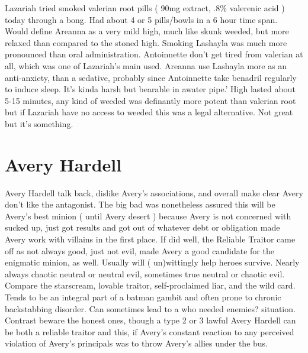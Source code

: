 \documentclass[12pt]{book}
\begin{document}
Lazariah tried smoked valerian root pills ( 90mg extract, .8\% valerenic acid ) today through a bong. Had about 4 or 5 pills/bowls in a 6 hour time span. Would define Areanna as a very mild high, much like skunk weeded, but more relaxed than compared to the stoned high. Smoking Lashayla was much more pronounced than oral administration. Antoinnette don't get tired from valerian at all, which was one of Lazariah's main used. Areanna use Lashayla more as an anti-anxiety, than a sedative, probably since Antoinnette take benadril regularly to induce sleep. It's kinda harsh but bearable in awater pipe.' High lasted about 5-15 minutes, any kind of weeded was definantly more potent than valerian root but if Lazariah have no access to weeded this was a legal alternative. Not great but it's something.



\chapter{Avery Hardell}

Avery Hardell talk back, dislike Avery's associations, and overall make clear Avery don't like the antagonist. The big bad was nonetheless assured this will be Avery's best minion ( until Avery desert ) because Avery is not concerned with sucked up, just got results and got out of whatever debt or obligation made Avery work with villains in the first place. If did well, the Reliable Traitor came off as not always good, just not evil, made Avery a good candidate for the enigmatic minion, as well. Usually will ( un)wittingly help heroes survive. Nearly always chaotic neutral or neutral evil, sometimes true neutral or chaotic evil. Compare the starscream, lovable traitor, self-proclaimed liar, and the wild card. Tends to be an integral part of a batman gambit and often prone to chronic backstabbing disorder. Can sometimes lead to a who needed enemies? situation. Contrast beware the honest ones, though a type 2 or 3 lawful Avery Hardell can be both a reliable traitor and this, if Avery's constant reaction to any perceived violation of Avery's principals was to throw Avery's allies under the bus.
\end{document}
